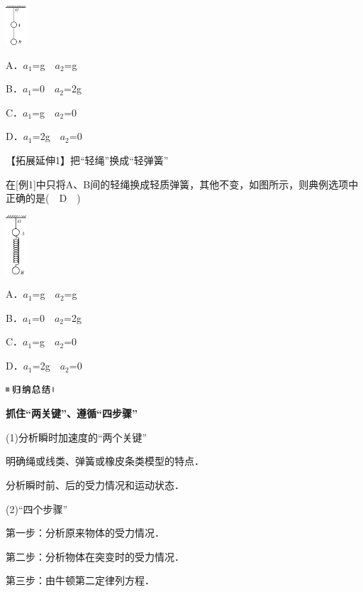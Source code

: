 \documentclass[cn,10.5pt,chinese,mac,chinesefont=founder]{elegantbook}
\begin{document}
\begin{center}\includegraphics[width=0.3in]{media/image101.png}
	
\end{center}

A．$a_1$=g　$a_2$=g

B．$a_1$=0　$a_2$=2g

C．$a_1$=g　$a_2$=0

D．$a_1$=2g　$a_2$=0

【拓展延伸1】把``轻绳''换成``轻弹簧''

在{[}例1{]}中只将A、B间的轻绳换成轻质弹簧，其他不变，如图所示，则典例选项中正确的是(　D　)

\begin{center}\includegraphics[width=0.3in]{media/image102.png}
	
\end{center}

A．$a_1$=g　$a_2$=g

B．$a_1$=0　$a_2$=2g

C．$a_1$=g　$a_2$=0

D．$a_1$=2g　$a_2$=0



\begin{center}\includegraphics[width=0.70833in,height=0.125in]{media/image13.png}

\textbf{抓住``两关键''、遵循``四步骤''}
\end{center}


(1)分析瞬时加速度的``两个关键''

明确绳或线类、弹簧或橡皮条类模型的特点．

分析瞬时前、后的受力情况和运动状态．

(2)``四个步骤''

第一步：分析原来物体的受力情况．

第二步：分析物体在突变时的受力情况．

第三步：由牛顿第二定律列方程．
\end{document}
